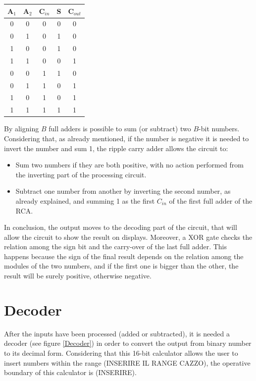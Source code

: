 \documentclass{article}
\begin{document}
\begin{table}[h]
  \centering
  \begin{tabular}{|| c | c | c || c | c ||}
  \hline
  A$_1$ & A$_2$ & C$_{in}$ & S & C$_{out}$ \\ \hline
  0 & 0 & 0 & 0 & 0 \\ \hline
  0 & 1 & 0 & 1 & 0 \\ \hline
  1 & 0 & 0 & 1 & 0 \\ \hline
  1 & 1 & 0 & 0 & 1 \\ \hline
  0 & 0 & 1 & 1 & 0 \\ \hline
  0 & 1 & 1 & 0 & 1 \\ \hline
  1 & 0 & 1 & 0 & 1 \\ \hline
  1 & 1 & 1 & 1 & 1 \\ \hline
  \end{tabular}
  \label{FullAdder}
\end{table}

By aligning $B$ full adders is possible to sum (or subtract) two $B$-bit numbers. Considering that, as already mentioned, if the number is negative it is needed to invert the number and sum 1, the ripple carry adder allows the circuit to:
\begin{itemize}
  \item Sum two numbers if they are both positive, with no action performed from the inverting part of the processing circuit.
  \item Subtract one number from another by inverting the second number, as already explained, and summing 1 as the first $C_{in}$ of the first full adder of the RCA.
\end{itemize}
  
In conclusion, the output moves to the decoding part of the circuit, that will allow the circuit to show the result on displays. Moreover, a XOR gate checks the relation among the sign bit and the carry-over of the last full adder. This happens because the sign of the final result depends on the relation among the modules of the two numbers, and if the first one is bigger than the other, the result will be surely positive, otherwise negative.





\clearpage
\section{Decoder}

After the inputs have been processed (added or subtracted), it is needed a decoder (see figure \ref{Decoder}) in order to convert the output from binary number to its decimal form. Considering that this 16-bit calculator allows the user to insert numbers within the range (INSERIRE IL RANGE CAZZO), the operative boundary of this calculator is (INSERIRE).
\end{document}
